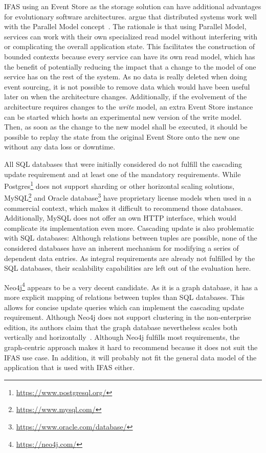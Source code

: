 \ac{IFAS} using an Event Store as the storage solution can have additional advantages for evolutionary software architectures.
\citet{ford2017building} argue that distributed systems work well with the Parallel Model concept~\cite{WEB:Fowler:2005-2}.
The rationale is that using Parallel Model, services can work with their own specialized read model without interfering with or complicating the overall application state.
This facilitates the construction of bounded contexts because every service can have its own read model, which has the benefit of potentially reducing the impact that a change to the model of one service has on the rest of the system.
As no data is really deleted when doing event sourcing, it is not possible to remove data which would have been useful later on when the architecture changes.
Additionally, if the evolvement of the architecture requires changes to the \emph{write} model, an extra Event Store instance can be started which hosts an experimental new version of the write model.
Then, as soon as the change to the new model shall be executed, it should be possible to replay the state from the original Event Store onto the new one without any data loss or downtime.

All \ac{SQL} databases that were initially considered do not fulfill the cascading update requirement and at least one of the mandatory requirements.
While Postgres\footnote{\url{https://www.postgresql.org/}} does not support sharding or other horizontal scaling solutions, MySQL\footnote{\url{https://www.mysql.com/}} and Oracle database\footnote{\url{https://www.oracle.com/database/}} have proprietary license models when used in a commercial context, which makes it difficult to recommend those databases.
Additionally, MySQL does not offer an own HTTP interface, which would complicate its implementation even more.
Cascading update is also problematic with \ac{SQL} databases: Although relations between tuples are possible, none of the considered databases have an inherent mechanism for modifying a series of dependent data entries.
As integral requirements are already not fulfilled by the \ac{SQL} databases, their scalability capabilities are left out of the evaluation here.

Neo4j\footnote{\url{https://neo4j.com/}} appears to be a very decent candidate.
As it is a graph database, it has a more explicit mapping of relations between tuples than \ac{SQL} databases.
This allows for concise update queries which can implement the cascading update requirement.
Although Neo4j does not support clustering in the non-enterprise edition, its authors claim that the graph database nevertheless scales both vertically and horizontally~\cite{Neo4jScalability}.
Although Neo4j fulfills most requirements, the graph-centric approach makes it hard to recommend because it does not suit the \ac{IFAS} use case.
In addition, it will probably not fit the general data model of the application that is used with \ac{IFAS} either.

